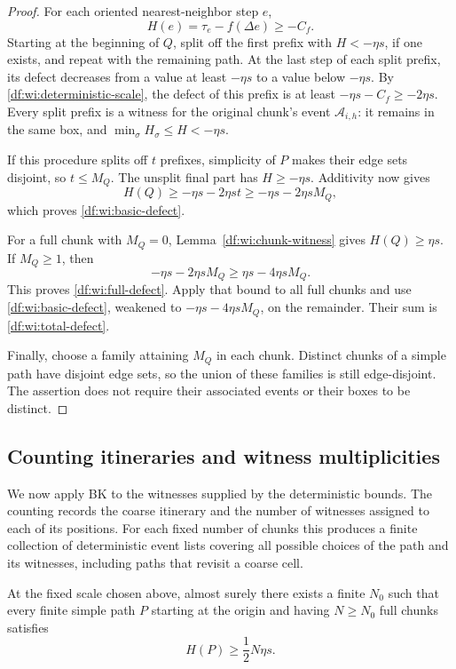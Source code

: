 \begin{proof}
For each oriented nearest-neighbor step $e$,
\[
  H(e)=\tau_e-f(\Delta e)\ge-C_f.
\]
Starting at the beginning of $Q$, split off the first prefix with
$H<-\eta s$, if one exists, and repeat with the remaining path.
At the last step of each split prefix, its defect decreases from a value
at least $-\eta s$ to a value below $-\eta s$.  By
\eqref{df:wi:deterministic-scale}, the defect of this prefix is at least
$-\eta s-C_f\ge-2\eta s$.  Every split prefix is a witness for the
original chunk's event $\mathcal A_{i,h}$: it remains in the same box,
and $\min_\sigma H_\sigma\le H<-\eta s$.

If this procedure splits off $t$ prefixes, simplicity of $P$ makes their
edge sets disjoint, so $t\le M_Q$.  The unsplit final part has
$H\ge-\eta s$.  Additivity now gives
\[
  H(Q)\ge-\eta s-2\eta s t
       \ge-\eta s-2\eta s M_Q,
\]
which proves \eqref{df:wi:basic-defect}.

For a full chunk with $M_Q=0$, Lemma~\ref{df:wi:chunk-witness} gives
$H(Q)\ge\eta s$.  If $M_Q\ge1$, then
\[
  -\eta s-2\eta s M_Q
  \ge\eta s-4\eta s M_Q.
\]
This proves \eqref{df:wi:full-defect}.  Apply that bound to all full chunks
and use \eqref{df:wi:basic-defect}, weakened to
$-\eta s-4\eta sM_Q$, on the remainder.  Their sum is
\eqref{df:wi:total-defect}.

Finally, choose a family attaining $M_Q$ in each chunk.  Distinct chunks
of a simple path have disjoint edge sets, so the union of these families
is still edge-disjoint.  The assertion does not require their associated
events or their boxes to be distinct.
\end{proof}

\subsection{Counting itineraries and witness multiplicities}

We now apply BK to the witnesses supplied by the deterministic bounds.
The counting records the coarse itinerary and the number of witnesses
assigned to each of its positions. For each fixed number of chunks this
produces a finite collection of deterministic event lists covering all
possible choices of the path and its witnesses, including paths that
revisit a coarse cell.

\begin{proposition}
\label{df:wi:long-paths}
At the fixed scale chosen above, almost surely there exists a finite
$N_0$ such that every finite simple path $P$ starting at the origin and
having $N\ge N_0$ full chunks satisfies
\begin{equation}
\label{df:wi:long-path-bound}
  H(P)\ge\frac12 N\eta s.
\end{equation}
\end{proposition}

